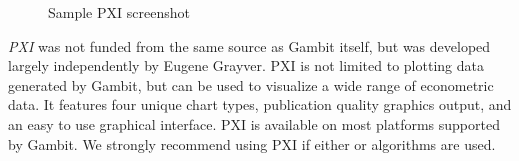 \documentclass[12pt]{report}
\begin{document}
\begin{figure}
\caption{Sample PXI screenshot}\label{fig_pxibig}
\end{figure}

{\em PXI} was not funded from the same source as Gambit itself, but was 
developed largely independently by Eugene Grayver.  PXI is not limited to
plotting data generated by Gambit, but can be used to visualize a wide range
of econometric data.  It features four unique chart types, publication quality
graphics output, and an easy to use graphical interface.  PXI is available on
most platforms supported by Gambit.  We strongly recommend using PXI if
either  or  algorithms are used.





%
\setfooter{\thepage}{}{}{}{}{\thepage}%
\end{document}
